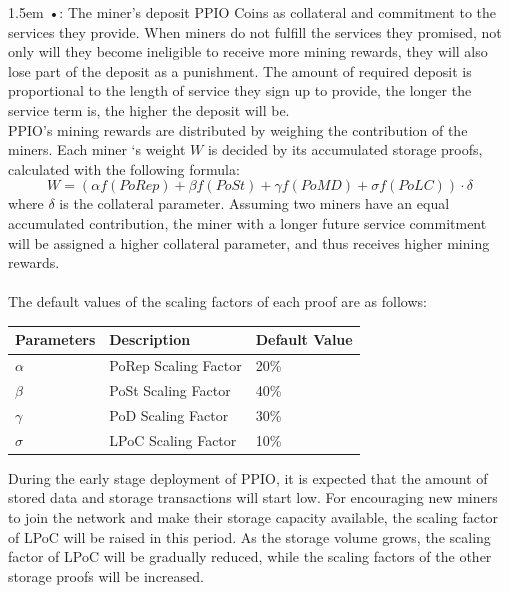 \documentclass[10pt,a4paper]{article}
\begin{document}
\hangindent 1.5em
\noindent   
•: The miner's deposit PPIO Coins as collateral and commitment to the services they provide. When miners do not fulfill the services they promised, not only will they become ineligible to receive more mining rewards, they will also lose part of the deposit as a punishment. The amount of required deposit is proportional to the length of service they sign up to provide, the longer the service term is, the higher the deposit will be.
   \vspace{-0.5em}
\\

\noindent  
PPIO’s mining rewards are distributed by weighing the contribution of the miners. Each miner ‘s weight $W$ is decided by its accumulated storage proofs, calculated with the following formula:
$$
W=(\alpha f(PoRep) + \beta f(PoSt) + \gamma f(PoMD) + \sigma f(PoLC) )\cdot\delta
$$
where $\delta$ is the collateral parameter. Assuming two miners have an equal accumulated contribution, the
miner with a longer future service commitment will be assigned a higher collateral parameter, and thus receives higher mining rewards.
   \vspace{-0.5em}
\\\\
The default values of the scaling factors of each proof are as follows:\\
   \vspace{-0.5em}
 \begin{center}
\begin{tabular}{|p{2.7cm}<{\centering}|p{3.4cm}<{\centering}|p{3cm}<{\centering}|}%
\hline  %
 Parameters & Description & Default Value \\
\hline  %
 $\alpha$& PoRep Scaling Factor&20\% \\
 \hline  %
 $\beta$&PoSt Scaling Factor&40\%\\
 \hline  %
  $\gamma$&PoD Scaling Factor&30\% \\
 \hline  %
  $\sigma$&LPoC Scaling Factor&10\%\\

\hline %
\end{tabular}
\end{center} 
 \vspace{0.5em}
During the early stage deployment of PPIO, it is expected that the amount of stored data and storage transactions will start low. For encouraging new miners to join the network and make their storage capacity available, the scaling factor of LPoC will be raised in this period. As the storage volume grows, the scaling factor of LPoC will be gradually reduced, while the scaling factors of the other storage proofs will be increased.
\end{document}
